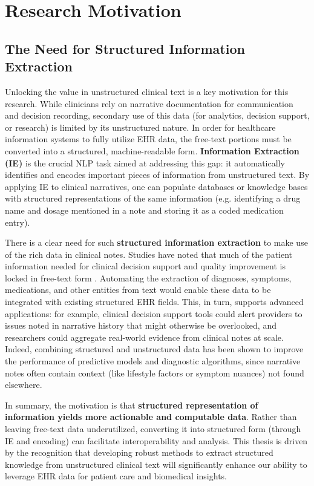 
\section{Research Motivation}

\subsection{The Need for Structured Information Extraction}

Unlocking the value in unstructured clinical text is a key motivation for this research. While clinicians rely on narrative documentation for communication and decision recording, secondary use of this data (for analytics, decision support, or research) is limited by its unstructured nature. In order for healthcare information systems to fully utilize EHR data, the free-text portions must be converted into a structured, machine-readable form. \textbf{Information Extraction (IE)} is the crucial NLP task aimed at addressing this gap: it automatically identifies and encodes important pieces of information from unstructured text. By applying IE to clinical narratives, one can populate databases or knowledge bases with structured representations of the same information (e.g. identifying a drug name and dosage mentioned in a note and storing it as a coded medication entry).

There is a clear need for such \textbf{structured information extraction} to make use of the rich data in clinical notes. Studies have noted that much of the patient information needed for clinical decision support and quality improvement is locked in free-text form \parencite{Liu2024}. Automating the extraction of diagnoses, symptoms, medications, and other entities from text would enable these data to be integrated with existing structured EHR fields. This, in turn, supports advanced applications: for example, clinical decision support tools could alert providers to issues noted in narrative history that might otherwise be overlooked, and researchers could aggregate real-world evidence from clinical notes at scale. Indeed, combining structured and unstructured data has been shown to improve the performance of predictive models and diagnostic algorithms, since narrative notes often contain context (like lifestyle factors or symptom nuances) not found elsewhere.

In summary, the motivation is that \textbf{structured representation of information yields more actionable and computable data}. Rather than leaving free-text data underutilized, converting it into structured form (through IE and encoding) can facilitate interoperability and analysis. This thesis is driven by the recognition that developing robust methods to extract structured knowledge from unstructured clinical text will significantly enhance our ability to leverage EHR data for patient care and biomedical insights.

